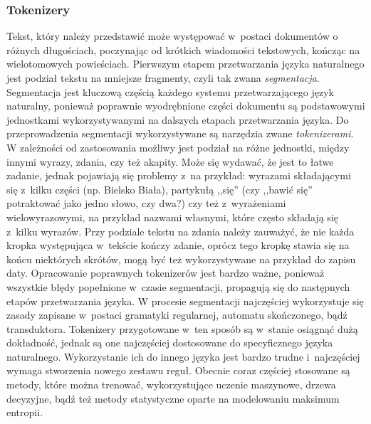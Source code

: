 \documentclass[a4paper, twoside, 12pt]{report}
\begin{document}
            \subsubsection{Tokenizery}
                Tekst, który należy przedstawić może występować w~postaci dokumentów o różnych długościach, poczynając od
                krótkich wiadomości tekstowych, kończąc na wielotomowych powieściach. Pierwszym etapem przetwarzania języka
                naturalnego jest podział tekstu na mniejsze fragmenty, czyli tak zwana \emph{segmentacja}. Segmentacja jest
                kluczową częścią każdego systemu przetwarzającego język naturalny, ponieważ poprawnie wyodrębnione części
                dokumentu są podstawowymi jednostkami wykorzystywanymi na dalszych etapach przetwarzania języka.
                Do przeprowadzenia segmentacji wykorzystywane są narzędzia zwane
                \emph{tokenizerami}.
                W zależności od zastosowania możliwy jest podział na różne jednostki, między innymi wyrazy, zdania, czy też akapity.
                Może się wydawać, że jest to łatwe zadanie, jednak pojawiają się problemy z~na przykład: wyrazami składającymi
                się z~kilku części (np. Bielsko Biała), partykułą ,,się'' (czy ,,bawić się'' potraktować jako jedno słowo, czy dwa?)
                czy też z~wyrażeniami wielowyrazowymi, na przykład nazwami własnymi, które często składają się z~kilku wyrazów.
                Przy podziale tekstu na zdania należy zauważyć, że nie każda kropka występująca w~tekście kończy zdanie, oprócz
                tego kropkę stawia się na końcu niektórych skrótów, mogą być też wykorzystywane na przykład do zapisu daty.
                Opracowanie poprawnych tokenizerów jest bardzo ważne, ponieważ wszystkie błędy popełnione w~czasie segmentacji,
                propagują się do następnych etapów przetwarzania języka. W procesie segmentacji najczęściej wykorzystuje się
                zasady zapisane w~postaci gramatyki regularnej, automatu skończonego, bądź transduktora. Tokenizery przygotowane
                w~ten sposób są w~stanie osiągnąć dużą dokładność, jednak są one najczęściej dostosowane do specyficznego języka
                naturalnego. Wykorzystanie ich do innego języka jest bardzo trudne i~najczęściej wymaga stworzenia nowego
                zestawu reguł. Obecnie coraz częściej stosowane są metody, które można trenować, wykorzystujące uczenie maszynowe,
                drzewa decyzyjne, bądź też metody statystyczne oparte na modelowaniu maksimum entropii\cite{HANDBOOKNLP}.
\end{document}
